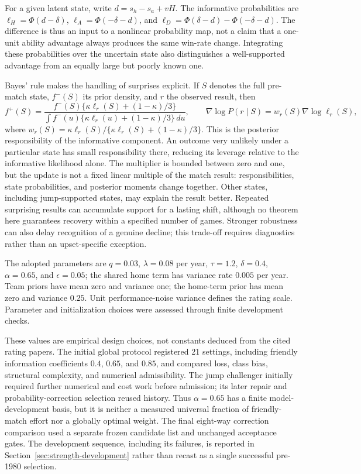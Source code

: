 For a given latent state, write $d=s_h-s_a+vH$. The informative probabilities are $\ell_H=\Phi(d-\delta)$, $\ell_A=\Phi(-\delta-d)$, and $\ell_D=\Phi(\delta-d)-\Phi(-\delta-d)$. The difference is thus an input to a nonlinear probability map, not a claim that a one-unit ability advantage always produces the same win-rate change. Integrating these probabilities over the uncertain state also distinguishes a well-supported advantage from an equally large but poorly known one.

Bayes' rule makes the handling of surprises explicit. If $S$ denotes the full pre-match state, $f^-(S)$ its prior density, and $r$ the observed result, then
\begin{equation}
 f^+(S)=\frac{f^-(S)\{\kappa\ell_r(S)+(1-\kappa)/3\}}{\int f^-(u)\{\kappa\ell_r(u)+(1-\kappa)/3\}\,du},\qquad
 \nabla\log P(r\mid S)=w_r(S)\nabla\log\ell_r(S),
 \label{eq:robust-learning}
\end{equation}
where $w_r(S)=\kappa\ell_r(S)/\{\kappa\ell_r(S)+(1-\kappa)/3\}$. This is the posterior responsibility of the informative component. An outcome very unlikely under a particular state has small responsibility there, reducing its leverage relative to the informative likelihood alone. The multiplier is bounded between zero and one, but the update is not a fixed linear multiple of the match result: responsibilities, state probabilities, and posterior moments change together. Other states, including jump-supported states, may explain the result better. Repeated surprising results can accumulate support for a lasting shift, although no theorem here guarantees recovery within a specified number of games. Stronger robustness can also delay recognition of a genuine decline; this trade-off requires diagnostics rather than an upset-specific exception.

The adopted parameters are $q=0.03$, $\lambda=0.08$ per year, $\tau=1.2$, $\delta=0.4$, $\alpha=0.65$, and $\epsilon=0.05$; the shared home term has variance rate $0.005$ per year. Team priors have mean zero and variance one; the home-term prior has mean zero and variance $0.25$. Unit performance-noise variance defines the rating scale. Parameter and initialization choices were assessed through finite development checks.

These values are empirical design choices, not constants deduced from the cited rating papers. The initial global protocol registered 21 settings, including friendly information coefficients $0.4$, $0.65$, and $0.85$, and compared loss, class bias, structural complexity, and numerical admissibility. The jump challenger initially required further numerical and cost work before admission; its later repair and probability-correction selection reused history. Thus $\alpha=0.65$ has a finite model-development basis, but it is neither a measured universal fraction of friendly-match effort nor a globally optimal weight. The final eight-way correction comparison used a separate frozen candidate list and unchanged acceptance gates. The development sequence, including its failures, is reported in Section~\ref{sec:strength-development} rather than recast as a single successful pre-1980 selection.

